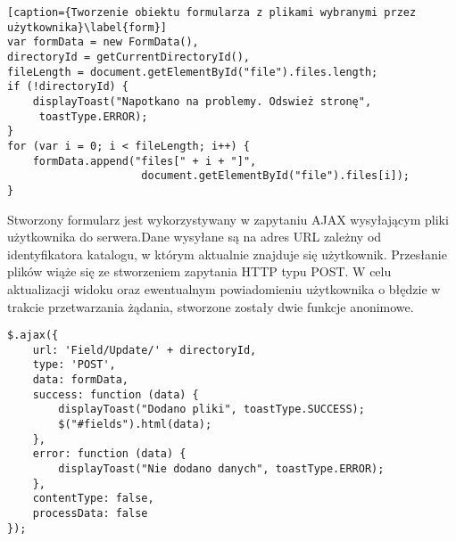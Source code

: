 \begin{itemize}
\newpage
\begin{lstlisting}[caption={Tworzenie obiektu formularza z plikami wybranymi przez użytkownika}\label{form}]
var formData = new FormData(),
directoryId = getCurrentDirectoryId(),
fileLength = document.getElementById("file").files.length;
if (!directoryId) {
	displayToast("Napotkano na problemy. Odswież stronę",
	 toastType.ERROR);
}
for (var i = 0; i < fileLength; i++) {
	formData.append("files[" + i + "]",
					 document.getElementById("file").files[i]);
}
\end{lstlisting}
Stworzony formularz jest wykorzystywany w zapytaniu AJAX wysyłającym pliki użytkownika do serwera.Dane wysyłane są na adres URL zależny od identyfikatora katalogu, w którym aktualnie znajduje się użytkownik. Przesłanie plików wiąże się ze stworzeniem zapytania HTTP typu POST. W celu aktualizacji widoku oraz ewentualnym powiadomieniu użytkownika o błędzie w trakcie przetwarzania żądania, stworzone zostały dwie funkcje anonimowe.
\begin{lstlisting}[caption=Tworzenie obiektu formularza z plikami wybranymi przez użytkownika]
  $.ajax({
	url: 'Field/Update/' + directoryId,
	type: 'POST',
	data: formData,
	success: function (data) {
		displayToast("Dodano pliki", toastType.SUCCESS);
		$("#fields").html(data);		
	},
	error: function (data) {
		displayToast("Nie dodano danych", toastType.ERROR);
	},
	contentType: false,
	processData: false
});
\end{lstlisting}


\end{itemize}
